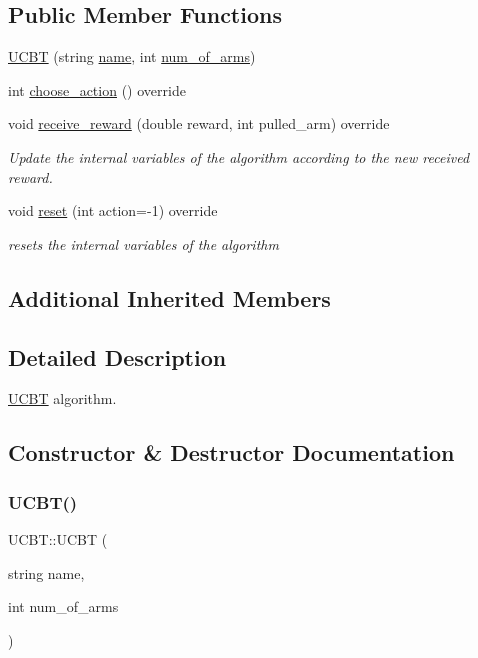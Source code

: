 \subsection*{Public Member Functions}
\begin{DoxyCompactItemize}
\item 
\mbox{\hyperlink{class_u_c_b_t_a5701cee651e665d7aaedac7e65887939}{U\+C\+BT}} (string \mbox{\hyperlink{class_m_a_b_algorithm_a77b10ecc4b49d519c557f65358167b82}{name}}, int \mbox{\hyperlink{class_m_a_b_algorithm_a340fa9e83e85b092f2c6125fc4e8549b}{num\+\_\+of\+\_\+arms}})
\item 
int \mbox{\hyperlink{class_u_c_b_t_a6bebf23b2dd926e49794a4fb0fefe358}{choose\+\_\+action}} () override
\item 
void \mbox{\hyperlink{class_u_c_b_t_a0e9b24c391f3934e59809419e0b04e52}{receive\+\_\+reward}} (double reward, int pulled\+\_\+arm) override
\begin{DoxyCompactList}\small\item\em Update the internal variables of the algorithm according to the new received reward. \end{DoxyCompactList}\item 
void \mbox{\hyperlink{class_u_c_b_t_a4830934c071870d6f8680f90a247f9a7}{reset}} (int action=-\/1) override
\begin{DoxyCompactList}\small\item\em resets the internal variables of the algorithm \end{DoxyCompactList}\end{DoxyCompactItemize}
\subsection*{Additional Inherited Members}


\subsection{Detailed Description}
\mbox{\hyperlink{class_u_c_b_t}{U\+C\+BT}} algorithm. 

\subsection{Constructor \& Destructor Documentation}
\mbox{\label{class_u_c_b_t_a5701cee651e665d7aaedac7e65887939}} 
\subsubsection{\texorpdfstring{U\+C\+B\+T()}{UCBT()}}
{\footnotesize\ttfamily U\+C\+B\+T\+::\+U\+C\+BT (\begin{DoxyParamCaption}\item[{string}]{name,  }\item[{int}]{num\+\_\+of\+\_\+arms }\end{DoxyParamCaption})}


